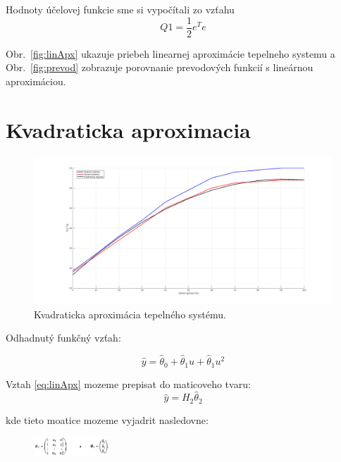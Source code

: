 \documentclass{article}
\begin{document}
Hodnoty účelovej funkcie sme si vypočítali zo vzťahu 
\begin{equation}
	Q1 = \frac{1}{2} e^Te
	\label{eq:objFunkcia}
\end{equation}

Obr.~\ref{fig:linApx} ukazuje priebeh linearnej aproximácie tepelneho systemu a
Obr.~\ref{fig:prevod} zobrazuje porovnanie prevodových funkcií s lineárnou aproximáciou.


\clearpage

\section{Kvadraticka aproximacia}
\label{sec:kvad}

\begin{figure}[!htbp]
	\begin{center}
		\includegraphics[width=\textwidth]{include/kvadraticka_regresia.png}
	\end{center}
	\caption{Kvadraticka aproximácia tepelného systému.}
	\label{fig:kvadApx}
\end{figure}

Odhadnutý funkčný vzťah:

\begin{equation}
	\hat{y} = \hat{\theta}_0 + \hat{\theta}_1u + \hat{\theta}_1u^2
	\label{eq:kvadApx}
\end{equation}

Vztah \ref{eq:linApx} mozeme prepisat do maticoveho tvaru:
\begin{equation}
	\hat{y} = H_2\hat{\theta}_2
	\label{eq:kvadApx2}
\end{equation}

kde tieto moatice mozeme vyjadrit nasledovne:

\begin{figure}[!htbp]
	\begin{center}
		\includegraphics[width=0.25\textwidth]{include/defHandTheta2.png}
	\end{center}
\end{figure}
\end{document}
